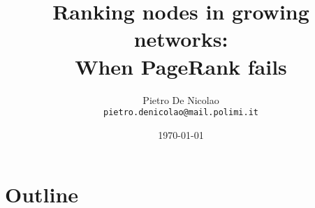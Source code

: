 \documentclass[utf8]{beamer}
\title[When PageRank fails]{Ranking nodes in growing networks: \\ When PageRank fails}
\author[De Nicolao]{Pietro De Nicolao \\ \texttt{pietro.denicolao@mail.polimi.it}}
\date{\today} %
\institute{Politecnico di Milano}
\begin{document}
\begin{frame}
    \titlepage
\end{frame}

\section*{Outline}
\begin{frame}
 \tableofcontents
\end{frame}






\end{document}
